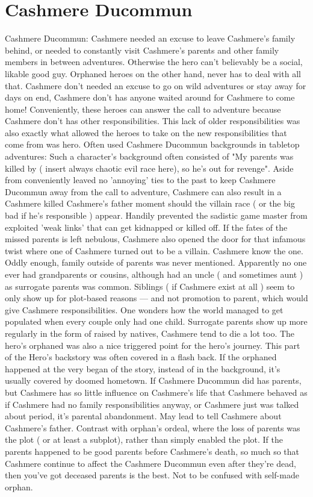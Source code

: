 \documentclass[12pt]{book}
\begin{document}
\chapter{Cashmere Ducommun}
Cashmere Ducommun: Cashmere needed an excuse to leave Cashmere's family behind, or needed to constantly visit Cashmere's parents and other family members in between adventures. Otherwise the hero can't believably be a social, likable good guy. Orphaned heroes on the other hand, never has to deal with all that. Cashmere don't needed an excuse to go on wild adventures or stay away for days on end, Cashmere don't has anyone waited around for Cashmere to come home! Conveniently, these heroes can answer the call to adventure because Cashmere don't has other responsibilities. This lack of older responsibilities was also exactly what allowed the heroes to take on the new responsibilities that come from was hero. Often used Cashmere Ducommun backgrounds in tabletop adventures: Such a character's background often consisted of "My parents was killed by ( insert always chaotic evil race here), so he's out for revenge". Aside from conveniently leaved no 'annoying' ties to the past to keep Cashmere Ducommun away from the call to adventure, Cashmere can also result in a Cashmere killed Cashmere's father moment should the villain race ( or the big bad if he's responsible ) appear. Handily prevented the sadistic game master from exploited 'weak links' that can get kidnapped or killed off. If the fates of the missed parents is left nebulous, Cashmere also opened the door for that infamous twist where one of Cashmere turned out to be a villain. Cashmere know the one. Oddly enough, family outside of parents was never mentioned. Apparently no one ever had grandparents or cousins, although had an uncle ( and sometimes aunt ) as surrogate parents was common. Siblings ( if Cashmere exist at all ) seem to only show up for plot-based reasons — and not promotion to parent, which would give Cashmere responsibilities. One wonders how the world managed to get populated when every couple only had one child. Surrogate parents show up more regularly in the form of raised by natives, Cashmere tend to die a lot too. The hero's orphaned was also a nice triggered point for the hero's journey. This part of the Hero's backstory was often covered in a flash back. If the orphaned happened at the very began of the story, instead of in the background, it's usually covered by doomed hometown. If Cashmere Ducommun did has parents, but Cashmere has so little influence on Cashmere's life that Cashmere behaved as if Cashmere had no family responsibilities anyway, or Cashmere just was talked about period, it's parental abandonment. May lead to tell Cashmere about Cashmere's father. Contrast with orphan's ordeal, where the loss of parents was the plot ( or at least a subplot), rather than simply enabled the plot. If the parents happened to be good parents before Cashmere's death, so much so that Cashmere continue to affect the Cashmere Ducommun even after they're dead, then you've got deceased parents is the best. Not to be confused with self-made orphan.
\end{document}
